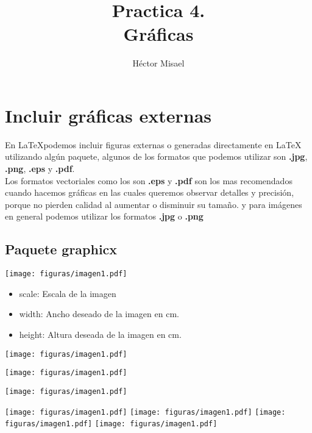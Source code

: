 \documentclass[12pt]{article}
\begin{document}
\title{Practica 4.\\ Gráficas}
\author{Héctor Misael}
\date{}
\maketitle
\tableofcontents

\section{Incluir gráficas externas}
En \LaTeX podemos incluir figuras externas o generadas  directamente en \LaTeX \, utilizando algún paquete, algunos de los formatos que podemos utilizar son \textbf{.jpg}, \textbf{.png}, \textbf{.eps} y \textbf{.pdf}.\\[0.5cm]
Los formatos vectoriales como los son \textbf{.eps} y \textbf{.pdf} son los mas recomendados cuando hacemos gráficas en las cuales queremos observar detalles y precisión, porque no pierden calidad al aumentar o disminuir su tamaño. y para imágenes en general podemos utilizar los formatos \textbf{.jpg} o \textbf{.png}

\subsection{Paquete graphicx}
\begin{center}
\texttt{[image: figuras/imagen1.pdf]}
\end{center}

\begin{itemize}
\item scale: Escala de la imagen
\item width: Ancho deseado de la imagen en cm.
\item height: Altura deseada de la imagen en cm.
\end{itemize}

\begin{center}
\texttt{[image: figuras/imagen1.pdf]}
\end{center}

\begin{center}
\texttt{[image: figuras/imagen1.pdf]}
\end{center}

\begin{center}
\texttt{[image: figuras/imagen1.pdf]}
\end{center}

\begin{center}
\texttt{[image: figuras/imagen1.pdf]} \quad
\texttt{[image: figuras/imagen1.pdf]} \quad
\texttt{[image: figuras/imagen1.pdf]} \quad
\texttt{[image: figuras/imagen1.pdf]} 
\end{center}
\end{document}
